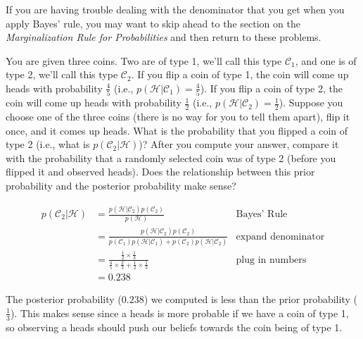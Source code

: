 \documentclass[assignment01_Solutions]{subfiles}
\begin{document}
\begin{exercise}[(20 minutes)]
\begin{notice}
If you are having trouble dealing with the denominator that you get when you apply Bayes' rule, you may want to skip ahead to the section on the \emph{Marginalization Rule for Probabilities} and then return to these problems.
\end{notice}
\bes
\item You are given three coins.  Two are of type 1, we'll call this type $\mathcal{C}_1$, and one is of type 2, we'll call this type $\mathcal{C}_2$. If you flip a coin of type 1, the coin will come up heads with probability $\frac{4}{5}$ (i.e., $p(\mathcal{H} | \mathcal{C}_1) = \frac{4}{5}$). If you flip a coin of type 2, the coin will come up heads with probability $\frac{1}{2}$ (i.e., $p(\mathcal{H} | \mathcal{C}_2) = \frac{1}{2}$).  Suppose you choose one of the three coins (there is no way for you to tell them apart), flip it once, and it comes up heads.  What is the probability that you flipped a coin of type 2 (i.e., what is $p(\mathcal{C}_2 | \mathcal{H})$)?  After you compute your answer, compare it with the probability that a randomly selected coin was of type 2 (before you flipped it and observed heads).  Does the relationship between this prior probability and the posterior probability make sense?

\begin{boxedsolution}
\begin{align}
p(\mathcal{C}_2 | \mathcal{H}) &= \frac{p(\mathcal{H} | \mathcal{C}_2) p(\mathcal{C}_2)}{p(\mathcal{H})} & \mbox{Bayes' Rule} \nonumber \\
&=  \frac{p(\mathcal{H} | \mathcal{C}_2) p(\mathcal{C}_2)}{p(\mathcal{C}_1) p(\mathcal{H}|\mathcal{C}_1) + p(\mathcal{C}_2) p(\mathcal{H}|\mathcal{C}_2)} & \mbox{expand denominator} \nonumber \\
&= \frac{ \frac{1}{2} \times \frac{1}{3}}{\frac{4}{5} \times \frac{2}{3} + \frac{1}{2} \times \frac{1}{3}} &\mbox{plug in numbers} \nonumber \\
&= 0.238 \nonumber
\end{align}

The posterior probability ($0.238$) we computed is less than the prior probability ($\frac{1}{3}$).  This makes sense since a heads is more probable if we have a coin of type 1, so observing a heads should push our beliefs towards the coin being of type 1.
\end{boxedsolution}



\end{exercise}
\end{document}
